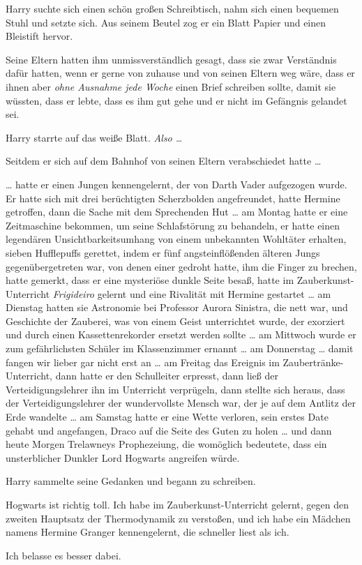 Harry suchte sich einen schön großen Schreibtisch, nahm sich einen bequemen Stuhl und setzte sich. Aus seinem Beutel zog er ein Blatt Papier und einen Bleistift hervor. 

Seine Eltern hatten ihm unmissverständlich gesagt, dass sie zwar Verständnis dafür hatten, wenn er gerne von zuhause und von seinen Eltern weg wäre, dass er ihnen aber \emph{ohne Ausnahme jede Woche} einen Brief schreiben sollte, damit sie wüssten, dass er lebte, dass es ihm gut gehe und er nicht im Gefängnis gelandet sei. 

Harry starrte auf das weiße Blatt. \emph{Also …} 

Seitdem er sich auf dem Bahnhof von seinen Eltern verabschiedet hatte … 

… hatte er einen Jungen kennengelernt, der von Darth Vader aufgezogen wurde. Er hatte sich mit drei berüchtigten Scherzbolden angefreundet, hatte Hermine getroffen, dann die Sache mit dem Sprechenden Hut … am Montag hatte er eine Zeitmaschine bekommen, um seine Schlafstörung zu behandeln, er hatte einen legendären Unsichtbarkeitsumhang von einem unbekannten Wohltäter erhalten, sieben Hufflepuffs gerettet, indem er fünf angsteinflößenden älteren Jungs gegenübergetreten war, von denen einer gedroht hatte, ihm die Finger zu brechen, hatte gemerkt, dass er eine mysteriöse dunkle Seite besaß, hatte im Zauberkunst-Unterricht \emph{Frigideiro} gelernt und eine Rivalität mit Hermine gestartet … am Dienstag hatten sie Astronomie bei Professor Aurora Sinistra, die nett war, und Geschichte der Zauberei, was von einem Geist unterrichtet wurde, der exorziert und durch einen Kassettenrekorder ersetzt werden sollte … am Mittwoch wurde er zum gefährlichsten Schüler im Klassenzimmer ernannt … am Donnerstag … damit fangen wir lieber gar nicht erst an … am Freitag das Ereignis im Zaubertränke-Unterricht, dann hatte er den Schulleiter erpresst, dann ließ der Verteidigungslehrer ihn im Unterricht verprügeln, dann stellte sich heraus, dass der Verteidigungslehrer der wundervollste Mensch war, der je auf dem Antlitz der Erde wandelte … am Samstag hatte er eine Wette verloren, sein erstes Date gehabt und angefangen, Draco auf die Seite des Guten zu holen … und dann heute Morgen Trelawneys Prophezeiung, die womöglich bedeutete, dass ein unsterblicher Dunkler Lord Hogwarts angreifen würde. 

Harry sammelte seine Gedanken und begann zu schreiben. 

\begin{writtenNote}

Hogwarts ist richtig toll. Ich habe im Zauberkunst-Unterricht gelernt, gegen den zweiten Hauptsatz der Thermodynamik zu verstoßen, und ich habe ein Mädchen namens Hermine Granger kennengelernt, die schneller liest als ich.

Ich belasse es besser dabei.

\end{writtenNote}
